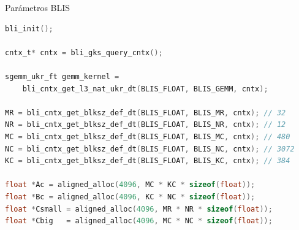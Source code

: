 \documentclass[aspectratio=43]{beamer}
\begin{document}
\begin{frame}%
\end{frame}

\begin{frame}%
\end{frame}

\begin{frame}[fragile]{Parámetros BLIS}
\begin{lstlisting}[language=C,basicstyle=\scriptsize\ttfamily]
bli_init();

cntx_t* cntx = bli_gks_query_cntx();

sgemm_ukr_ft gemm_kernel =
    bli_cntx_get_l3_nat_ukr_dt(BLIS_FLOAT, BLIS_GEMM, cntx);

MR = bli_cntx_get_blksz_def_dt(BLIS_FLOAT, BLIS_MR, cntx); // 32
NR = bli_cntx_get_blksz_def_dt(BLIS_FLOAT, BLIS_NR, cntx); // 12
MC = bli_cntx_get_blksz_def_dt(BLIS_FLOAT, BLIS_MC, cntx); // 480
NC = bli_cntx_get_blksz_def_dt(BLIS_FLOAT, BLIS_NC, cntx); // 3072
KC = bli_cntx_get_blksz_def_dt(BLIS_FLOAT, BLIS_KC, cntx); // 384

float *Ac = aligned_alloc(4096, MC * KC * sizeof(float));
float *Bc = aligned_alloc(4096, KC * NC * sizeof(float));
float *Csmall = aligned_alloc(4096, MR * NR * sizeof(float));
float *Cbig   = aligned_alloc(4096, MC * NC * sizeof(float));
\end{lstlisting}
\end{frame}
\end{document}
